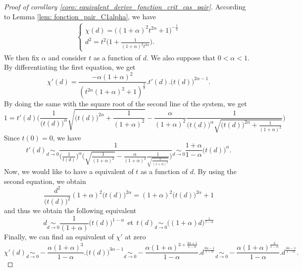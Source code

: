 \documentclass[11pt,reqno,a4paper]{article}%
\theoremstyle{definition}
\theoremstyle{remark}
\begin{document}
\begin{proof}[Proof of corollary \ref{coro: equivalent_derive_fonction_crit_cas_pair}]
According to Lemma \ref{lem: fonction_pair_C1alpha}, we have
\begin{align*}
    \left\{ \begin{array}{l}
       \chi(d) = \bigg( (1+\alpha)^2 t^{2 \alpha} + 1 \bigg)^{-\frac{1}{2}}\\
        d^2 = t^2 \bigg( 1 + \frac{1}{(1+\alpha)^2 t^{2 \alpha}} \bigg).
    \end{array} 
   \right.
\end{align*}
We then fix $\alpha$ and consider $t$ as a function of $d$.
We also suppose that $0 < \alpha < 1$.
By differentiating the first equation, we get
$$\chi'(d) = \frac{ - \alpha (1+ \alpha)^2}{( t^{2 \alpha} (1+\alpha)^2 + 1)^{\frac{3}{2}}} . t'(d) . \big(t(d)\big)^{2\alpha - 1}.$$
By doing the same with the square root of the second line of the system, we get
$$1 = t'(d) \Bigg( \frac{1}{\big(t(d)\big)^{\alpha}} \sqrt{ \big(t(d)\big)^{2 \alpha} + \frac{1}{(1+\alpha)^2 }} - \frac{\alpha}{ (1+\alpha)^2} \frac{1}{\big(t(d)\big)^{\alpha} \sqrt{\big(t(d)\big)^{2 \alpha} + \frac{1}{ (1+\alpha)^2}}}\Bigg)$$
Since $t(0) = 0$, we have 
$$t'(d) \underset{d \to 0}{\sim}  \frac{1}{\Big( \frac{1}{t(d)} \Big)^\alpha \bigg( \sqrt{\frac{1}{(1+\alpha)^2}} - \frac{\alpha}{(1+\alpha)^2} \frac{1}{\sqrt{\frac{1}{(1+\alpha)^2}}} \bigg) } \underset{d \to 0}{\sim} 
\frac{1+\alpha}{1 - \alpha}  \big(t(d)\big)^{\alpha}.$$
Now, we would like to have a equivalent of $t$ as a function of $d$. 
By using the second equation, we obtain 
$$\frac{d^2}{\big(t(d)\big)^2} (1+\alpha)^2 \big(t(d)\big)^{2 \alpha} =  (1+\alpha)^2\big(t(d)\big)^{2 \alpha} + 1$$
and thus we obtain the following equivalent
$$d \underset{d \to 0}{\sim} \frac{1}{(1+ \alpha)} \big(t(d)\big)^{1 - \alpha} ~~ \text{et} ~~ t(d) \underset{d \to 0}{\sim} \big((1+\alpha) d \big)^{\frac{1}{1-\alpha}} $$
Finally, we can find an equivalent of $\chi'$ at zero
$$\chi'(d) \underset{d \to 0}{\sim} - \frac{ \alpha (1+ \alpha)^3 }{1-\alpha} . \big(t(d)\big)^{3 \alpha - 1} \underset{d \to 0}{\sim} - \frac{ \alpha (1 + \alpha)^{3 + \frac{3 \alpha + 1}{1-\alpha}}}{1-\alpha} . d^\frac{3 \alpha - 1}{1-\alpha} \underset{d \to 0}{\sim} - \frac{\alpha (1 + \alpha)^{\frac{2}{1-\alpha}}}{1-\alpha} . d^\frac{3 \alpha - 1}{1-\alpha}.$$

\end{proof}






\end{document}

